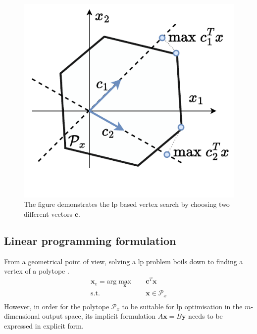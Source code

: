 \begin{figure}
\vspace{-1.5cm}
    \centering
    \includegraphics[width=\linewidth]{Papers/images/lp_explication.pdf}
    \caption{The figure demonstrates the \gls{lp} based vertex search by choosing two different vectors $\bm{c}$.}
    \label{fig:lp_explication}
\end{figure}
\subsection{Linear programming formulation}
\label{ch:lp_adapt}

From a geometrical point of view, solving a \gls{lp} problem boils down to finding a vertex of a polytope \cite{vajda_gass_1964}. 
\begin{equation}
\begin{aligned}
    \bm{x}_v = \text{arg}\max_{\bm{x}} \quad &  \bm{c}^T\bm{x} \\
     \textrm{s.t.} ~~&\bm{x} \in \mathcal{P}_x \\
\end{aligned}
\label{eq:lin_prog_generic}
\end{equation}
However, in order for the polytope $\mathcal{P}_x$ to be suitable for \gls{lp} optimisation in the $m$-dimensional output space, its implicit formulation $A\bm{x}=B\bm{y}$ needs to be expressed in explicit form.

